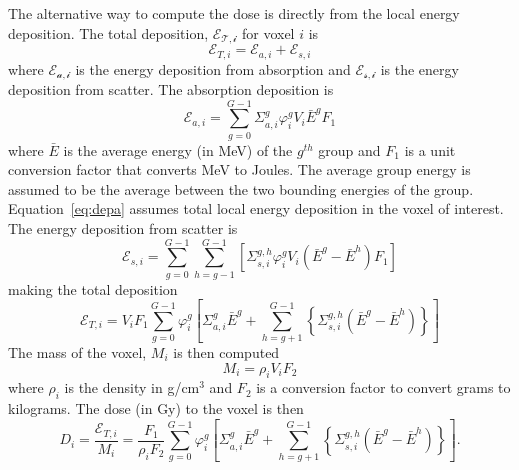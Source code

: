 The alternative way to compute the dose is directly from the local energy deposition. The total deposition, $\mathcal{E_{T,i}}$ for voxel $i$ is
\begin{equation}\label{eq:dept}
\mathcal{E}_{T,i} = \mathcal{E}_{a,i} + \mathcal{E}_{s,i}
\end{equation} 
where $\mathcal{E_{a,i}}$ is the energy deposition from absorption and $\mathcal{E_{s,i}}$ is the energy deposition from scatter. The absorption deposition is
\begin{equation}\label{eq:depa}
\mathcal{E}_{a,i} = \sum_{g=0}^{G-1} \Sigma_{a,i}^g \varphi_i^g V_i \bar{E}^g F_1
\end{equation}
where $\bar{E}$ is the average energy (in MeV) of the $g^{th}$ group and $F_1$ is a unit conversion factor that converts MeV to Joules. The average group energy is assumed to be the average between the two bounding energies of the group. Equation~\ref{eq:depa} assumes total local energy deposition in the voxel of interest. The energy deposition from scatter is
\begin{equation}\label{eq:deps}
\mathcal{E}_{s,i} = \sum_{g=0}^{G-1} \sum_{h=g-1}^{G-1} \left[ \Sigma_{s,i}^{g,h} \varphi_i^g V_i (\bar{E}^g-\bar{E}^h) F_1 \right]
\end{equation}
making the total deposition
\begin{equation}\label{eq:dept2}
\mathcal{E}_{T,i} = V_i F_1 \sum_{g=0}^{G-1} \varphi_i^g \left[\Sigma_{a,i}^g \bar{E}^g + \sum_{h=g+1}^{G-1} \left\{ \Sigma_{s,i}^{g,h}  (\bar{E}^g-\bar{E}^h) \right\} \right]
\end{equation}
The mass of the voxel, $M_i$ is then computed
\begin{equation}
M_i = \rho_i V_i F_2
\end{equation}
where $\rho_i$ is the density in g/cm$^3$ and $F_2$ is a conversion factor to convert grams to kilograms. The dose (in Gy) to the voxel is then
\begin{equation}\label{eq:dosedep}
D_i = \frac{\mathcal{E}_{T,i}}{M_i} = \frac{F_1}{\rho_i F_2} \sum_{g=0}^{G-1} \varphi_i^g \left[\Sigma_{a,i}^g \bar{E}^g + \sum_{h=g+1}^{G-1} \left\{ \Sigma_{s,i}^{g,h}  (\bar{E}^g-\bar{E}^h) \right\} \right].
\end{equation}

\endinput
